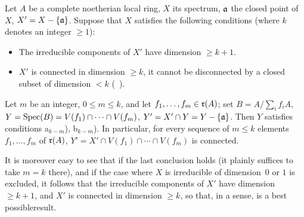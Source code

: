 \begin{theoreme} \label{XIII.2.1}
Let $A$ be a complete noetherian local ring, $X$ its spectrum, $\mathfrak{a}$ the closed point of $X$, $X'=X-\{ \mathfrak{a}\}$. Suppose that $X$ satisfies the following conditions (where $k$ denotes an integer $\ge 1$):
\begin{itemize}
\item[a$_k$)] The irreducible components of $X'$ have dimension $\ge k+1$.

\item[b$_k$)] $X'$ is connected in dimension $\ge k$, \ie it cannot be disconnected by a closed subset of dimension $<k$ (\cf {}~).
\end{itemize}

Let $m$ be an integer, $0\le m\le k$, and let $f_1, \dotsc, f_m\in \mathfrak{r}(A)$; set $B=A/\sum_i f_iA$, $Y=\operatorname{Spec}(B)=V(f_1)\cap\dotsb\cap V(f_m)$, $Y'=X'\cap Y=Y-\{\mathfrak{a}\}$. Then $Y$ satisfies conditions a$_{k-m}$), b$_{k-m}$). In particular, for every sequence of $m\le k$ elements $f_1, \dotsc, f_m$ of $\mathfrak{r}(A)$, $Y'=X'\cap V(f_1)\cap\dotsb\cap V(f_m)$ is connected.
\end{theoreme}

It is moreover easy to see that if the last conclusion holds (it plainly suffices to take $m=k$ there), and if the case where $X$ is irreducible of dimension~$0$ or $1$ is excluded, it follows that the irreducible components of $X'$ have dimension $\ge k+1$, and $X'$ is connected in dimension $\geq k$, so that, in a sense,  is a \og best possible\fg result.

\bigskip

